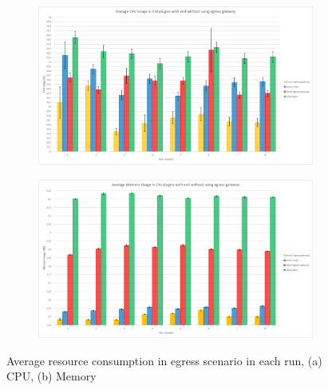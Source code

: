 \begin{figure}[H]
    \centering
    \begin{subfigure}[b]{0.9\textwidth}
        \includegraphics[width=\textwidth]{plots/egress/cpu_all.png}
        \caption{}
        \label{fig:cpu_all}
    \end{subfigure}
    \begin{subfigure}[b]{0.9\textwidth}
        \includegraphics[width=\textwidth]{plots/egress/memory_all.png}
        \caption{}
        \label{fig:memory_all}
    \end{subfigure}
    
    \caption{Average resource consumption in egress scenario in each run, (a) CPU, (b) Memory}
    \label{fig:res_all}
\end{figure}



